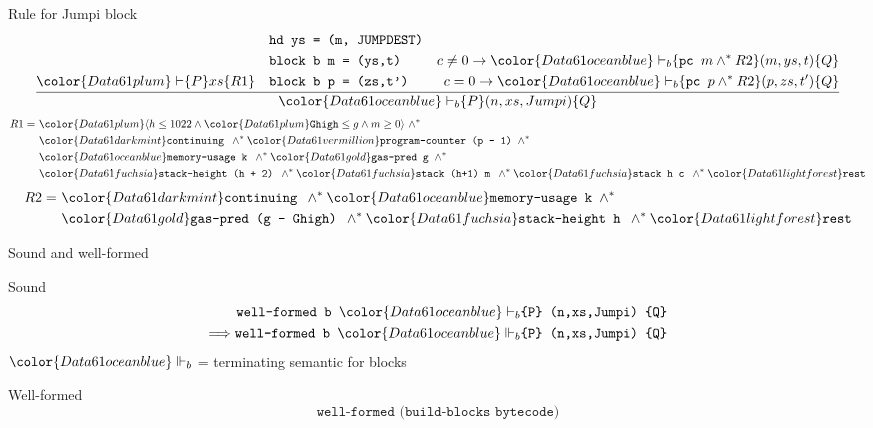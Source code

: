 \documentclass{beamer}
\begin{document}
\begin{frame}{Rule for Jumpi block}
	\footnotesize
	$$\frac{
		\begin{aligned}
		&\texttt{hd ys = (m, JUMPDEST)}\\
		& \texttt{block b m = (ys,t)}
		&c \neq 0 \rightarrow {\color{Data61 ocean blue}\vdash_b} \{\texttt{pc } m \wedge^* R2\} (m,ys,t) \{Q\}
		\\
		{\color{Data61 plum}\vdash} \{P\} xs \{R1\} \quad
		&\texttt{block b p = (zs,t')}
		&c=0 \rightarrow{\color{Data61 ocean blue}\vdash_b} \{\texttt{pc } p \wedge^* R2\} (p,zs,t') \{Q\}
		\end{aligned}
		}
	{{\color{Data61 ocean blue}\vdash_b} \{P\} (n,xs,Jumpi) \{Q\}}$$
	\begin{align*}
	R1 = ~& {\color{Data61 plum}\langle h \leq 1022 \wedge \color{Data61 plum}\texttt{Ghigh} \leq g \wedge m \geq 0 \rangle}~ \wedge^* \\
	&{\color{Data61 dark mint}\texttt{continuing }} \wedge^*
	{\color{Data61 vermillion}\texttt{program-counter (p - 1) }}\wedge^*\\
	&{\color{Data61 ocean blue}\texttt{memory-usage k }} \wedge^*
	{\color{Data61 gold}\texttt{gas-pred g }} \wedge^*\\
	&{\color{Data61 fuchsia}\texttt{stack-height (h + 2) }} \wedge^*
	{\color{Data61 fuchsia}\texttt{stack (h+1) m }} \wedge^*
	{\color{Data61 fuchsia}\texttt{stack h c }} \wedge^*
	{\color{Data61 light forest}\texttt{rest}}\\
	\end{align*}
	\begin{align*}
	R2 = ~&{\color{Data61 dark mint}\texttt{continuing }} \wedge^*
	{\color{Data61 ocean blue}\texttt{memory-usage k }} \wedge^*\\
	&{\color{Data61 gold}\texttt{gas-pred (g - Ghigh) }} \wedge^*
	{\color{Data61 fuchsia}\texttt{stack-height h }} \wedge^*
	{\color{Data61 light forest}\texttt{rest}}\\
	\end{align*}
\end{frame}

\begin{frame}{Sound and well-formed}
	\begin{block}{Sound}
		\begin{align*}\texttt{well-formed b }{\color{Data61 ocean blue}\vdash_b} \texttt{\{P\} }&\texttt{(n,xs,Jumpi) \{Q\}}\\
		\Longrightarrow
		\texttt{well-formed b }{\color{Data61 ocean blue}\Vdash_b} \texttt{\{P\} }&\texttt{(n,xs,Jumpi) \{Q\}}
		\end{align*}
	${\color{Data61 ocean blue}\Vdash_b}$ = terminating semantic for blocks
	\end{block}
	\begin{block}{Well-formed}
		\[\texttt{well-formed (build-blocks bytecode)}\]
	\end{block}
\end{frame}
\end{document}
